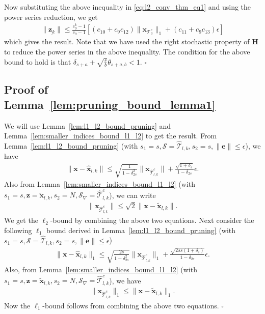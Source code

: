 \documentclass[journal]{IEEEtran}
\newcommand{\mbx}{\mathbf{x}}
\newcommand{\mbH}{\mathbf{H}}
\newcommand{\mbe}{\mathbf{e}}
\newcommand{\mbz}{\mathbf{z}}
\newcommand{\T}{\mathcal{T}}
\newcommand*{\QEDB}{\hfill\ensuremath{\square}}%
\begin{document}
Now substituting the above inequality in \eqref{eq:l2_conv_thm_eq1} and using the power series reduction, we get
\begin{eqnarray*}
\underline{\|\mbz_{k}\|} \leq \frac{c_9^k-1}{c_9-1}\left[(c_{10}+c_9 c_{12})\|\mbx_{\T_0^c}\|_1 + (c_{11}+c_9 c_{13})\epsilon\right]
\end{eqnarray*}
which gives the result. Note that we have used the right stochastic property of $\mbH$ to reduce the power series in the above inequality. The condition for the above bound to hold is that $\delta_{s+a}+\sqrt{\frac{s}{b}}\theta_{s+a,b} < 1$.  \QEDB

\subsection{Proof of Lemma~\ref{lem:pruning_bound_lemma1}}
We will use Lemma~\ref{lem:l1_l2_bound_pruning} and Lemma~\ref{lem:smaller_indices_bound_l1_l2} to get the result. From Lemma~\ref{lem:l1_l2_bound_pruning} (with $s_1 = s, \mathcal{S} = \hat{\T}_{l,k}, s_2 = s, \|\mbe\| \leq \epsilon$), we have
\begin{eqnarray*}
\|\mbx-\hat{\mbx}_{l,k}\| \leq \sqrt{\frac{1}{1-\delta_{2s}^2}}\|\mbx_{\hat{\T}^c_{l,k}}\| + \frac{\sqrt{1+\delta_{s}}}{1-\delta_{2s}}\epsilon.
\end{eqnarray*}
Also from Lemma~\ref{lem:smaller_indices_bound_l1_l2} (with $s_1 = s, \mbz = \tilde{\mbx}_{l,k}, s_2 = N, \mathcal{S}_{\nabla} = \hat{\T}_{l,k}^c$), we can write
\begin{eqnarray*}
\|\mbx_{\hat{\T}^c_{l,k}}\| \leq \sqrt{2}\|\mbx - \tilde{\mbx}_{l,k}\|.
\end{eqnarray*}
We get the $\ell_2$-bound by combining the above two equations. Next consider the following $\ell_1$ bound derived in Lemma~\ref{lem:l1_l2_bound_pruning} (with $s_1 = s, \mathcal{S} = \hat{\T}_{l,k}, s_2 = s, \|\mbe\| \leq \epsilon$)
\begin{eqnarray*}
\|\mbx-\hat{\mbx}_{l,k}\|_1 \leq \sqrt{\frac{2s}{1-\delta_{2s}^2}}\|\mbx_{\hat{\T}^c_{l,k}}\|_1 + \frac{\sqrt{2ss(1+\delta_{s})}}{1-\delta_{2s}}\epsilon.
\end{eqnarray*}
Also, from Lemma~\ref{lem:smaller_indices_bound_l1_l2} (with $s_1 = s, \mbz = \tilde{\mbx}_{l,k}, s_2 = N, \mathcal{S}_{\nabla} = \hat{\T}_{l,k}^c$), we have
\begin{eqnarray*}
\|\mbx_{\hat{\T}^c_{l,k}}\|_1 \leq \|\mbx - \tilde{\mbx}_{l,k}\|_1.
\end{eqnarray*}
Now the $\ell_1$-bound follows from combining the above two equations.
\QEDB
\end{document}
